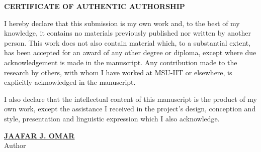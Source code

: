\begin{center}
	\noindent \textbf{CERTIFICATE OF AUTHENTIC AUTHORSHIP}
\end{center}

\vspace{1cm}

I hereby declare that this submission is my own work and, to the best of my knowledge, it contains no materials previously published nor written by another person. This work does not also contain material which, to a substantial extent, has been accepted for an award of any other degree or diploma, except where due acknowledgement is made in the manuscript. Any contribution made to the research by others, with whom I have worked at MSU-IIT or elsewhere, is explicitly acknowledged in the manuscript.

\vspace{1cm}

I also declare that the intellectual content of this manuscript is the product of my own work, except the assistance I received in the project's design, conception and style, presentation and linguistic expression which I also acknowledge.

\vspace{1cm}

\vspace{0.7cm}
\begin{minipage}{12.5cm}
	\begin{center}
		\begin{singlespace}
			\textbf{\underline{\MakeUppercase{JAAFAR J. OMAR}}} \\
			\vspace{0.1cm}
			Author\\
		\end{singlespace}
	\end{center}
\end{minipage}